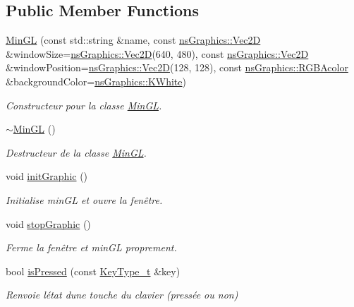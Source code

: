 \subsection*{Public Member Functions}
\begin{DoxyCompactItemize}
\item 
\hyperlink{class_min_g_l_aecc35a286d1adbcbdc76bf26df18169c}{Min\+GL} (const std\+::string \&name, const \hyperlink{classns_graphics_1_1_vec2_d}{ns\+Graphics\+::\+Vec2D} \&window\+Size=\hyperlink{classns_graphics_1_1_vec2_d}{ns\+Graphics\+::\+Vec2D}(640, 480), const \hyperlink{classns_graphics_1_1_vec2_d}{ns\+Graphics\+::\+Vec2D} \&window\+Position=\hyperlink{classns_graphics_1_1_vec2_d}{ns\+Graphics\+::\+Vec2D}(128, 128), const \hyperlink{classns_graphics_1_1_r_g_b_acolor}{ns\+Graphics\+::\+R\+G\+B\+Acolor} \&background\+Color=\hyperlink{namespacens_graphics_a8c5fcb477a548c6ed321748ec8383bb2}{ns\+Graphics\+::\+K\+White})
\begin{DoxyCompactList}\small\item\em Constructeur pour la classe \hyperlink{class_min_g_l}{Min\+GL}. \end{DoxyCompactList}\item 
\hyperlink{class_min_g_l_a0f84e59dd311785a7e6da848abd5d188}{$\sim$\+Min\+GL} ()
\begin{DoxyCompactList}\small\item\em Destructeur de la classe \hyperlink{class_min_g_l}{Min\+GL}. \end{DoxyCompactList}\item 
void \hyperlink{class_min_g_l_a5962a0a0ced7879bc0cc65e267e8d7fc}{init\+Graphic} ()
\begin{DoxyCompactList}\small\item\em Initialise min\+GL et ouvre la fenêtre. \end{DoxyCompactList}\item 
void \hyperlink{class_min_g_l_a9508f3ac9d4cb4f444f56f5d77ed9d86}{stop\+Graphic} ()
\begin{DoxyCompactList}\small\item\em Ferme la fenêtre et min\+GL proprement. \end{DoxyCompactList}\item 
bool \hyperlink{class_min_g_l_a8f0833403a4fb3df8010c132e81b207f}{is\+Pressed} (const \hyperlink{class_min_g_l_a6e612d21ed9723c37ad91093f7b48c96}{Key\+Type\+\_\+t} \&key)
\begin{DoxyCompactList}\small\item\em Renvoie l\textquotesingle{}état d\textquotesingle{}une touche du clavier (pressée ou non) \end{DoxyCompactList}\item 

\end{DoxyCompactItemize}
